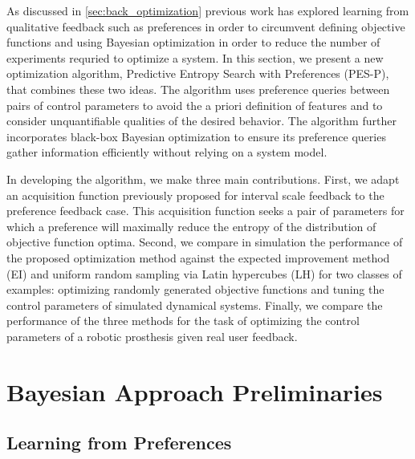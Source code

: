 As discussed in \cref{sec:back_optimization} previous work
has explored learning from qualitative feedback such as preferences in order to
circumvent defining objective functions and using Bayesian optimization in order
to reduce the number of experiments requried to optimize a system. In this
section, we present a new optimization algorithm, Predictive Entropy Search with
Preferences (PES-P), that combines these two ideas. The algorithm uses
preference queries between pairs of control parameters to avoid the a priori
definition of features and to consider unquantifiable qualities of the desired
behavior. The algorithm further incorporates black-box Bayesian optimization to
ensure its preference queries gather information efficiently without relying on
a system model.

In developing the algorithm, we make three main contributions. First, we adapt
an acquisition function previously proposed for interval scale feedback to the
preference feedback case. This acquisition function seeks a pair of parameters
for which a preference will maximally reduce the entropy of the distribution of
objective function optima. Second, we compare in simulation the performance of
the proposed optimization method against the expected improvement method (EI)
and uniform random sampling via Latin hypercubes (LH) for two classes of
examples: optimizing randomly generated objective functions and tuning the
control parameters of simulated dynamical systems.  Finally, we compare the
performance of the three methods for the task of optimizing the control
parameters of a robotic prosthesis given real user feedback.

\section{Bayesian Approach Preliminaries} 
\subsection{Learning from Preferences}

